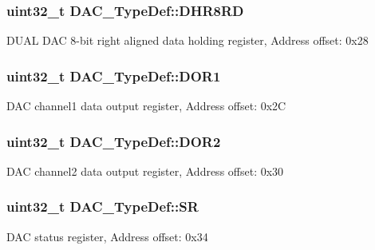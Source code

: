 \subsubsection[{\texorpdfstring{D\+H\+R8\+RD}{DHR8RD}}]{ uint32\+\_\+t D\+A\+C\+\_\+\+Type\+Def\+::\+D\+H\+R8\+RD}\hypertarget{struct_d_a_c___type_def_a03f8d95bbf0ce3a53cb79506d5bf995a}{}\label{struct_d_a_c___type_def_a03f8d95bbf0ce3a53cb79506d5bf995a}
D\+U\+AL D\+AC 8-\/bit right aligned data holding register, Address offset\+: 0x28 
\subsubsection[{\texorpdfstring{D\+O\+R1}{DOR1}}]{ uint32\+\_\+t D\+A\+C\+\_\+\+Type\+Def\+::\+D\+O\+R1}\hypertarget{struct_d_a_c___type_def_a50b4f0b0d2a376f729c8d7acf47864c3}{}\label{struct_d_a_c___type_def_a50b4f0b0d2a376f729c8d7acf47864c3}
D\+AC channel1 data output register, Address offset\+: 0x2C 
\subsubsection[{\texorpdfstring{D\+O\+R2}{DOR2}}]{ uint32\+\_\+t D\+A\+C\+\_\+\+Type\+Def\+::\+D\+O\+R2}\hypertarget{struct_d_a_c___type_def_a1bde8391647d6422b39ab5ba4f13848b}{}\label{struct_d_a_c___type_def_a1bde8391647d6422b39ab5ba4f13848b}
D\+AC channel2 data output register, Address offset\+: 0x30 
\subsubsection[{\texorpdfstring{SR}{SR}}]{ uint32\+\_\+t D\+A\+C\+\_\+\+Type\+Def\+::\+SR}\hypertarget{struct_d_a_c___type_def_a1d3fd83d6ed8b2d90b471db4509b0e70}{}\label{struct_d_a_c___type_def_a1d3fd83d6ed8b2d90b471db4509b0e70}
D\+AC status register, Address offset\+: 0x34 
